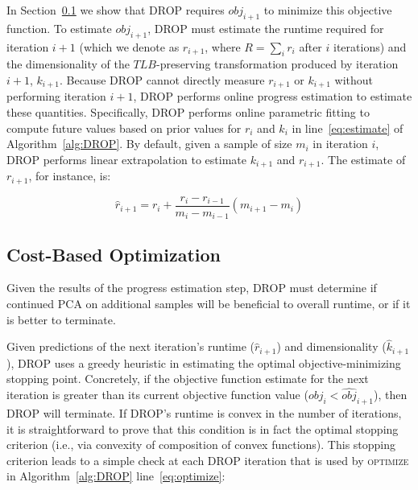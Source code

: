 In Section~\ref{subsec:opt} we show that DROP requires $obj_{i+1}$ to minimize this objective function.
To estimate $obj_{i+1}$, DROP must estimate the runtime required for iteration $i+1$ (which we denote as $r_{i+1}$, where $R=\sum_i r_i$ after $i$ iterations) and the dimensionality of the $TLB$-preserving transformation produced by iteration $i+1$, $k_{i+1}$. 
Because DROP cannot directly measure $r_{i+1}$ or $k_{i+1}$ without performing iteration $i+1$, DROP performs online progress estimation to estimate these quantities. Specifically, DROP performs online parametric fitting to compute future values based on prior values for $r_{i}$ and $k_i$ in line~\ref{eq:estimate} of Algorithm~\ref{alg:DROP}. 
By default, given a sample of size $m_i$ in iteration $i$, DROP performs linear extrapolation to estimate $k_{i+1}$ and $r_{i+1}$. The estimate of $r_{i+1}$, for instance, is:

\vspace{-.4cm}
\begin{equation*}
\hat{r}_{i+1} = r_i + \frac{r_i - r_{i-1}}{m_i - m_{i-1}} (m_{i+1} -  m_i)
\end{equation*}



\subsection{Cost-Based Optimization}
\label{subsec:opt}

Given the results of the progress estimation step, DROP must determine if continued PCA on additional samples will be beneficial to overall runtime, or if it is better to terminate. 

Given predictions of the next iteration's runtime ($\hat{r}_{i+1}$) and dimensionality ($\hat{k}_{i+1}$), DROP uses a greedy heuristic in estimating the optimal objective-minimizing stopping point.
Concretely, if the objective function estimate for the next iteration is greater than its current objective function value ($obj_i < \widehat{obj}_{i+1}$), then DROP will terminate. 
If DROP's runtime is convex in the number of iterations, it is straightforward to prove that this condition is in fact the optimal stopping criterion (i.e., via convexity of composition of convex functions). 
This stopping criterion leads to a simple check at each DROP iteration that is used by  \textsc{optimize} in Algorithm~\ref{alg:DROP} line~\ref{eq:optimize}: 

